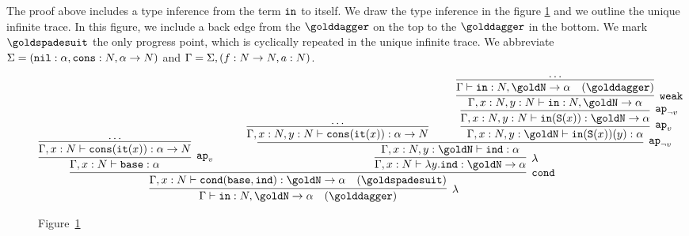 The proof above includes a type inference from the term ${\tt in}$ to itself.
We draw the type inference in the figure \ref{figure-term-interval}
and we outline the unique infinite trace. 
In this figure, we include a back edge from the 
$\golddagger$ on the top to the $\golddagger$ in the bottom.
We mark $\goldspadesuit$ the only progress point, which is cyclically repeated in 
the unique infinite trace. We abbreviate 
$\Sigma = ({\tt nil}:\alpha, {\tt cons}:{N},\alpha \rightarrow {N})$
and
$\Gamma = \Sigma,(f:{N} \rightarrow {N}, a:{N})$.

\begin{figure}
\label{figure-term-interval}


\begin{center}
  
\[
   {\infer[\lambda]  
     {\Gamma \vdash \interval:\N,\goldN\rightarrow\alpha 
       \ \ \ (\golddagger) }
       {\infer[\cond]{\Gamma, x:\N 
	\vdash 
	\cond (\base,  \inductive )
	:\goldN\rightarrow\alpha \ \ \ (\goldspadesuit) } 
       {\infer[\apvar]{\Gamma, x:\N 
	           \vdash 
	           \base:\alpha}
             {\infer[]{\Gamma, x:\N 
	           \vdash 
	           \cons(\iter(x)):\alpha \rightarrow\N}{\ldots}}
            {\ \ \ \ \ \ }  &
          \infer[\lambda]{\Gamma, x:\N 
	           \vdash 
	           \lambda y.\inductive : \goldN\rightarrow\alpha}
             {\infer[\apnotvar]{\Gamma, x:\N, y:\goldN \vdash
               \inductive : \alpha}
            {\infer[]
                     {\Gamma, x:\N, y:\N 
                          \vdash \cons(\iter(x)):\alpha\rightarrow\N}{\ldots}
               {\ \ \ \ \ \ }
                     {\infer[\apvar]{\Gamma, x:\N, y:\goldN 
                          \vdash \interval(\Succ(x))(y):\alpha}
                         {\infer[\apnotvar]{\Gamma, x:\N, y:\N 
                          \vdash \interval(\Succ(x)):\goldN \rightarrow\alpha}
                              {\infer[\weak]{\Gamma, x:\N, y:\N 
                          \vdash \interval:\N,\goldN \rightarrow\alpha}
                                {\infer[]{\Gamma 
                          \vdash \interval:\N,\goldN \rightarrow\alpha
                           \ \ \ (\golddagger)}
              {\ldots}}}}}
             }
           }
         }
       }  
    }
\]

\mbox{Figure \ref{figure-term-interval}}
\end{center}

\end{figure}

